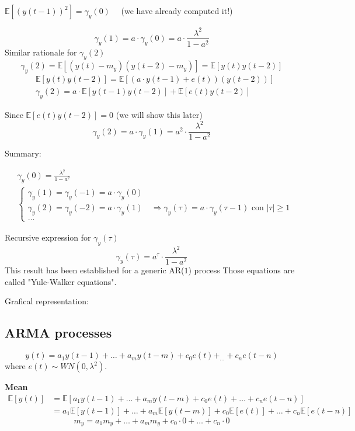$\mathbb{E}\left[(y(t-1))^{2}\right]=\gamma_{y}(0) \quad$ (we have already computed it!)

$$
\gamma_{y}(1)=a \cdot \gamma_{y}(0)=a \cdot \frac{\lambda^{2}}{1-a^{2}}
$$
Similar rationale for $\gamma_{y}(2)$
$$
\gamma_{y}(2)=\mathbb{E}\left\lfloor\left(y(t)-m_{y}\right)\left(y(t-2)-m_{y}\right)\right]=\mathbb{E}[y(t) y(t-2)]
$$
\begin{align*}
	&\mathbb{E}[y(t) y(t-2)]=\mathbb{E}[(a \cdot y(t-1)+e(t))(y(t-2))] \\
	&\gamma_{y}(2)=a \cdot \mathbb{E}[y(t-1) y(t-2)]+\mathbb{E}[e(t) y(t-2)]
\end{align*}

Since $\mathbb{E}[e(t) y(t-2)]=0$ (we will show this later)
$$
\gamma_{y}(2)=a \cdot \gamma_{y}(1)=a^{2} \cdot \frac{\lambda^{2}}{1-a^{2}}
$$

Summary:

\begin{align*}
	&\gamma_{y}(0)=\frac{\lambda^{2}}{1-a^{2}} \\
	&\left\{\begin{array}{l}
		\gamma_{y}(1)=\gamma_{y}(-1)=a \cdot \gamma_{y}(0) \\
		\gamma_{y}(2)=\gamma_{y}(-2)=a \cdot \gamma_{y}(1) \quad \Rightarrow \gamma_{y}(\tau)=a \cdot \gamma_{y}(\tau-1) \text { con }|\tau| \geq 1 \\
		\ldots
	\end{array}\right.
\end{align*}

Recursive expression for $\gamma_{y}(\tau)$
$$
\gamma_{y}(\tau)=a^{\tau} \cdot \frac{\lambda^{2}}{1-a^{2}}
$$
This result has been established for a generic AR($1$) process
Those equations are called "Yule-Walker equations".

Grafical representation:



\subsection{ARMA processes}
$$
y(t)=a_{1} y(t-1)+\ldots+a_{m} y(t-m)+c_{0} e(t)+_{\ldots}+c_{n} e(t-n)
$$
where $e(t) \sim W N\left(0, \lambda^{2}\right)$.

\textbf{Mean}
\begin{align*}
	\mathbb{E}[y(t)] &=\mathbb{E}\left[a_{1} y(t-1)+\ldots+a_{m} y(t-m)+c_{0} e(t)+\ldots+c_{n} e(t-n)\right] \\
	&=a_{1} \mathbb{E}[y(t-1)]+\ldots+a_{m} \mathbb{E}[y(t-m)]+c_{0} \mathbb{E}[e(t)]+\ldots+c_{n} \mathbb{E}[e(t-n)]
\end{align*}
$$
m_{y}=a_{1} m_{y}+\ldots+a_{m} m_{y}+c_{0} \cdot 0+\ldots+c_{n} \cdot 0
$$

